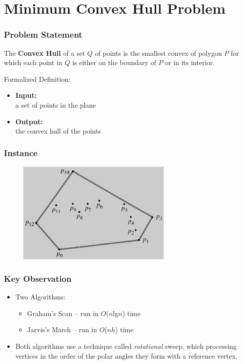\documentclass[slidestop,compress,mathserif]{beamer}
\begin{document}


\section{Minimum Convex Hull Problem}
\frame
{
\frametitle{Problem Statement}
The {\bf Convex Hull} of a set $Q$ of points is the smallest convex of polygon $P$ for which each point in $Q$ is either on the boundary of $P$ or in its interior.
\begin{block}{Formalized Definition:}
\begin{itemize}
    \item {\bf Input:} \\a set of points in the plane
    \item {\bf Output:}\\the convex hull of the points
\end{itemize}
\end{block}
}


\frame
{
\frametitle{Instance}
\begin{figure}
 \includegraphics[width=3in]{example.eps}
\end{figure}

}

\frame
{
    \frametitle{Key Observation}
    \begin{itemize}
        \item Two Algorithms:
            \begin{itemize}
                \item Graham's Scan -- run in $O$($n$lg$n$) time
                \item Jarvis's March -- run in $O$($nh$) time
            \end{itemize}
        \item Both algorithms use a technique called \emph{rotational} sweep, which processing vertices in the order of the polar angles they form with a reference vertex.
     \end{itemize}
}
\end{document}
